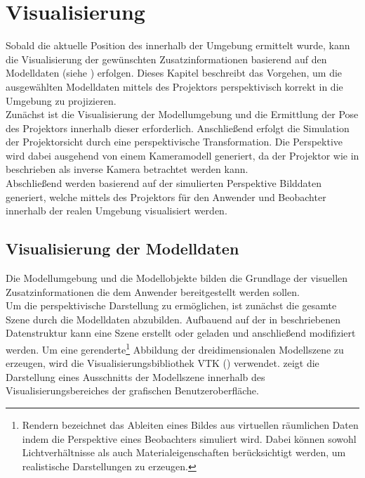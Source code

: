 \chapter{Visualisierung}
\label{chap.vis}

\prever{
\red[TODO:\\
]
}

Sobald die aktuelle Position des  innerhalb der Umgebung ermittelt wurde, kann die Visualisierung der gewünschten Zusatzinformationen basierend auf den Modelldaten (siehe ) erfolgen. Dieses Kapitel beschreibt das Vorgehen, um die ausgewählten Modelldaten mittels des Projektors perspektivisch korrekt in die Umgebung zu projizieren.\\
Zunächst ist die Visualisierung der Modellumgebung und die Ermittlung der Pose des Projektors innerhalb dieser erforderlich. Anschließend erfolgt die Simulation der Projektorsicht durch eine perspektivische Transformation. Die Perspektive wird dabei ausgehend von einem Kameramodell generiert, da der Projektor wie in  beschrieben als inverse Kamera betrachtet werden kann.\\
Abschließend werden basierend auf der simulierten Perspektive Bilddaten generiert, welche mittels des Projektors für den Anwender und Beobachter innerhalb der realen Umgebung visualisiert werden.

\section{Visualisierung der Modelldaten}
Die Modellumgebung und die Modellobjekte bilden die Grundlage der visuellen Zusatzinformationen die dem Anwender bereitgestellt werden sollen. \\
Um die perspektivische Darstellung zu ermöglichen, ist zunächst die gesamte Szene durch die Modelldaten abzubilden. Aufbauend auf der in  beschriebenen Datenstruktur kann eine Szene erstellt oder geladen und anschließend modifiziert werden. Um eine gerenderte\footnote{Rendern bezeichnet das Ableiten eines Bildes aus virtuellen räumlichen Daten indem die Perspektive eines Beobachters simuliert wird. Dabei können sowohl Lichtverhältnisse als auch Materialeigenschaften berücksichtigt werden, um realistische Darstellungen zu erzeugen.} Abbildung der dreidimensionalen Modellszene zu erzeugen, wird die Visualisierungsbibliothek VTK () verwendet.  zeigt die Darstellung eines Ausschnitts der Modellszene innerhalb des Visualisierungsbereiches der grafischen Benutzeroberfläche.\\

